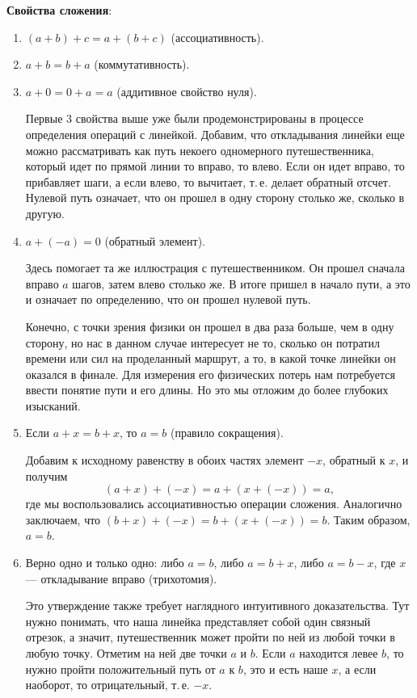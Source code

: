 \textbf{Свойства сложения}:
\begin{enumerate}[label=S\arabic*]
\item $(a+b)+c=a+(b+c)$ (ассоциативность).
\item $a+b=b+a$ (коммутативность).
\item $a+0=0+a=a$ (аддитивное свойство нуля).

Первые 3 свойства выше уже были продемонстрированы в процессе определения операций с линейкой. Добавим, что откладывания линейки еще можно рассматривать как путь некоего одномерного путешественника, который идет по прямой линии то вправо, то влево. Если он идет вправо, то прибавляет шаги, а если влево, то вычитает, т.\,е. делает обратный отсчет. Нулевой путь означает, что он прошел в одну сторону столько же, сколько в другую.

\item $a+(-a)=0$ (обратный элемент).

Здесь помогает та же иллюстрация с путешественником. Он прошел сначала вправо $a$ шагов, затем влево столько же. В итоге пришел в начало пути, а это и означает по определению, что он прошел нулевой путь.

Конечно, с точки зрения физики он прошел в два раза больше, чем в одну сторону, но нас в данном случае интересует не то, сколько он потратил времени или сил на проделанный маршрут, а то, в какой точке линейки он оказался в финале. Для измерения его физических потерь нам потребуется ввести понятие пути и его длины. Но это мы отложим до более глубоких изысканий.

\item Если $a+x=b+x$, то $a=b$ (правило сокращения).

Добавим к исходному равенству в обоих частях элемент $-x$, обратный к $x$, и получим
$$
(a+x)+(-x) = a+(x+(-x)) = a,
$$
где мы воспользовались ассоциативностью операции сложения. Аналогично заключаем, что $(b+x)+(-x) = b+(x+(-x)) = b$. Таким образом, $a=b$.

\item Верно одно и только одно: либо $a=b$, либо $a=b+x$, либо $a=b-x$, где $x$ --- откладывание вправо (трихотомия).

Это утверждение также требует наглядного интуитивного доказательства. Тут нужно понимать, что наша линейка представляет собой один связный отрезок, а значит, путешественник может пройти по ней из любой точки в любую точку. Отметим на ней две точки $a$ и $b$. Если $a$ находится левее $b$, то нужно пройти положительный путь от $a$ к $b$, это и есть наше $x$, а если наоборот, то отрицательный, т.\,е. $-x$.
\end{enumerate}

